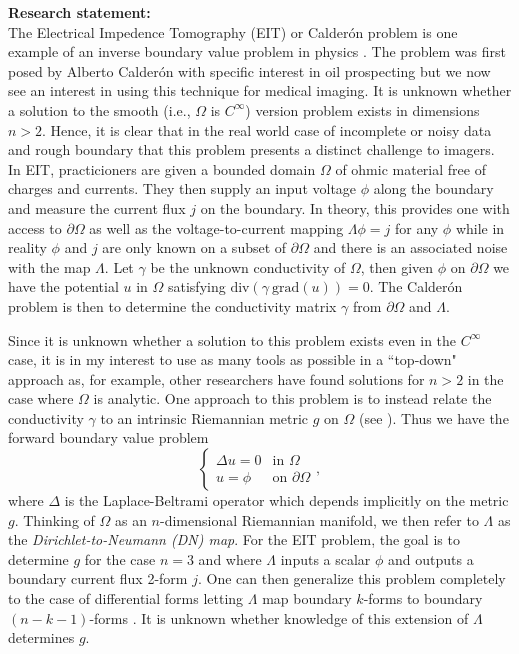 \documentclass{article}
\begin{document}
\noindent \textbf{Research statement:}\\

The Electrical Impedence Tomography (EIT) or Calder\'on problem is one example of an inverse boundary value problem in physics \cite{feldman_calderproblem_nodate}. The problem was first posed by Alberto Calder\'on with specific interest in oil prospecting but we now see an interest in using this technique for medical imaging. It is unknown whether a solution to the smooth (i.e., $\Omega$ is $C^\infty$) version problem exists in dimensions $n>2$. Hence, it is clear that in the real world case of incomplete or noisy data and rough boundary that this problem presents a distinct challenge to imagers. In EIT, practicioners are given a bounded domain $\Omega$ of ohmic material free of charges and currents. They then supply an input voltage $\phi$ along the boundary and measure the current flux $j$ on the boundary. In theory, this provides one with access to $\partial \Omega$ as well as the voltage-to-current mapping $\Lambda \phi = j$ for any $\phi$ while in reality $\phi$ and $j$ are only known on a subset of $\partial \Omega$ and there is an associated noise with the map $\Lambda$. Let $\gamma$ be the unknown conductivity of $\Omega$, then given $\phi$ on $\partial \Omega$ we have the potential $u$ in $\Omega$ satisfying $\textrm{div} (\gamma ~\textrm{grad}(u))=0$. The Calder\'on problem is then to determine the conductivity matrix $\gamma$ from $\partial \Omega$ and $\Lambda$.

Since it is unknown whether a solution to this problem exists even in the $C^\infty$ case, it is in my interest to use as many tools as possible in a ``top-down" approach as, for example, other researchers have found solutions for $n>2$ in the case where $\Omega$ is analytic. One approach to this problem is to instead relate the conductivity $\gamma$ to an intrinsic Riemannian metric $g$ on $\Omega$ (see \cite{uhlmann_inverse_2014}). Thus we have the forward boundary value problem
\[
\begin{cases} \Delta u = 0 & \textrm{in $\Omega$} \\ u = \phi & \textrm{on $\partial \Omega$} \end{cases},
\]
where $\Delta$ is the Laplace-Beltrami operator which depends implicitly on the metric $g$. Thinking of $\Omega$ as an $n$-dimensional Riemannian manifold, we then refer to $\Lambda$ as the \emph{Dirichlet-to-Neumann (DN) map}. For the EIT problem, the goal is to determine $g$ for the case $n=3$ and where $\Lambda$ inputs a scalar $\phi$ and outputs a boundary current flux 2-form $j$. One can then generalize this problem completely to the case of differential forms letting $\Lambda$ map boundary $k$-forms to boundary $(n-k-1)$-forms \cite{belishev_dirichlet_2008, sharafutdinov_complete_2013}. It is unknown whether knowledge of this extension of $\Lambda$ determines $g$.
\end{document}
